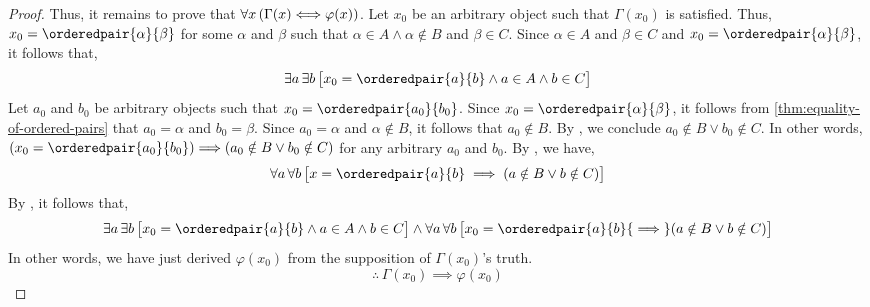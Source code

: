\begin{proof}
    Thus, it remains to prove that \( \forall x \, \mleft( \Gamma(x) {\iff} \varphi(x) \mright) \). Let \( x_{0} \) be an arbitrary object
    such that \( \Gamma(x_{0}) \) is satisfied. Thus, \( x_{0} = \orderedpair{\alpha}{\beta} \) for some \( \alpha \) and \( \beta \)
    such that \( \alpha \in A \land \alpha \notin B \) and \( \beta \in C \). Since \( \alpha \in A \) and \( \beta \in C \) and
    \( x_{0} = \orderedpair{\alpha}{\beta}\), it follows that,
    \begin{equation*}
        \exists a \, \exists b \, \big[ x_{0} = \orderedpair{a}{b} \land a \in A \land b \in C \big]
    \end{equation*}
    Let \( a_{0} \) and \( b_{0} \) be arbitrary objects such that \( x_{0} = \orderedpair{a_{0}}{b_{0}} \). Since \( x_{0} = \orderedpair{\alpha}{\beta} \),
    it follows from \cref{thm:equality-of-ordered-pairs} that \( a_{0} = \alpha \) and \( b_{0} = \beta \). Since \( a_{0} = \alpha \) and
    \( \alpha \notin B \), it follows that \( a_{0} \notin B \).
    By , we conclude \( a_{0} \notin B \lor b_{0} \notin C \).
    In other words, \( (x_{0} = \orderedpair{a_{0}}{b_{0}}) {\implies} \mleft( a_{0} \notin B \lor b_{0} \notin C \mright) \) for any arbitrary
    \( a_{0} \) and \( b_{0} \). By , we have,
    \begin{equation*}
        \forall a \, \forall b \, \big[ x = \orderedpair{a}{b} \implies \mleft( a \notin B \lor b \notin C \mright) \big]
    \end{equation*}
    By , it follows that,
    \begin{equation*}
        \exists a \, \exists b \, \big[ x_{0} = \orderedpair{a}{b} \land a \in A \land b \in C \big]
        \land
        \forall a \, \forall b \, \big[ x_{0} = \orderedpair{a}{b} {\implies} \mleft( a \notin B \lor b \notin C \mright) \big]
    \end{equation*}
    In other words, we have just derived \( \varphi(x_{0}) \) from the supposition of \( \Gamma(x_{0}) \)'s truth.
    \begin{equation*}
        \therefore \, \Gamma(x_{0}) \implies \varphi(x_{0})
    \end{equation*}


\end{proof}
